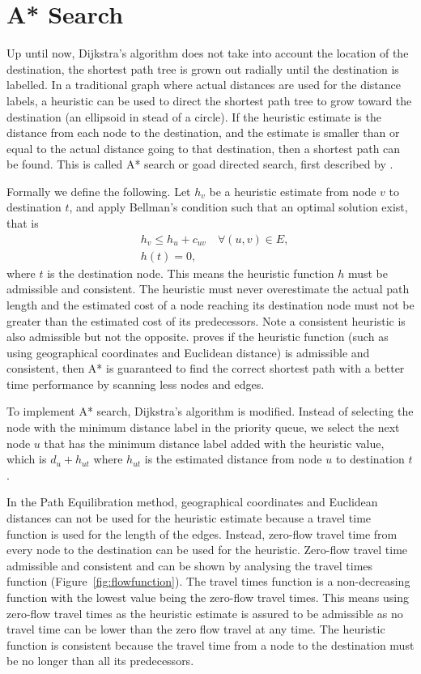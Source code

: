 \section{A* Search}\label{section:A*}
Up until now,
Dijkstra's algorithm does not take into account the location of the destination,
the shortest path tree is grown out radially until the destination is labelled.
In a traditional graph where actual distances are used for the distance labels,
a heuristic can be used to direct the shortest path tree to grow toward the destination (an ellipsoid in stead of a circle).
If the heuristic estimate is the distance from each node to the destination,
and the estimate is smaller than or equal to the actual distance going to that destination,
then a shortest path can be found. This is called A* search or goad directed search, first described by \citet{Astar}.

Formally we define the following.
Let $h_v$ be a heuristic estimate from node $v$ to destination $t$,
and apply Bellman's condition such that an optimal solution exist, that is 
\begin{align}
    &h_v \leq h_u + c_{uv} \quad \forall(u,v) \in E, \\
    &h(t) = 0,
\end{align}
where $t$ is the destination node.
This means the heuristic function $h$ must be admissible and consistent.
The heuristic must never overestimate the actual path length and the estimated cost of a node reaching its destination node must not be greater than the estimated cost of its predecessors.
Note a consistent heuristic is also admissible but not the opposite.
\citet{Astar} proves if the heuristic function (such as using geographical coordinates and Euclidean distance) is admissible and consistent,
then A* is guaranteed to find the correct shortest path with a better time performance by scanning less nodes and edges.

To implement A* search,
Dijkstra's algorithm is modified.
Instead of selecting the node with the minimum distance label in the priority queue,
we select the next node $u$ that has the minimum distance label added with the heuristic value, which is $d_u + h_{ut}$ where $h_{ut}$ is the estimated distance from node $u$ to destination $t$.

In the Path Equilibration method,
geographical coordinates and Euclidean distances can not be used for the heuristic estimate because a travel time function is used for the length of the edges.
Instead, zero-flow travel time from every node to the destination can be used for the heuristic.
Zero-flow travel time admissible and consistent and can be shown by
analysing the travel times function (Figure~\ref{fig:flowfunction}).
The travel times function is a non-decreasing function with the lowest value being the zero-flow travel times.
This means using zero-flow travel times as the heuristic estimate
is assured to be admissible
as no travel time can be lower than the zero flow travel at any time.
The heuristic function is consistent because the travel time from a node to the destination must be no longer than all its predecessors.

